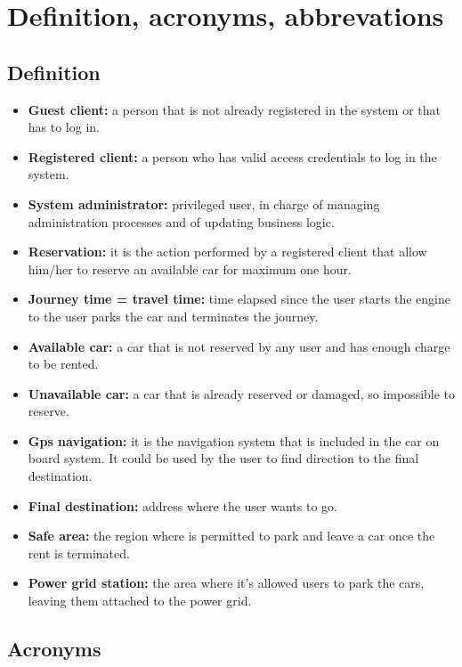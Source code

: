 \section{Definition, acronyms, abbrevations}

\subsection{Definition}

\begin{itemize}
\item \textbf{Guest client:} a person that is not already registered in the system or that has to log in.
\item \textbf{Registered client:} a person who has valid access credentials to log in the system.
\item \textbf{System administrator:} privileged user, in charge of managing administration processes and of updating business logic.
\item \textbf{Reservation:} it is the action performed by a registered client that allow him/her to reserve an available car for maximum one hour.
\item \textbf{Journey time = travel time:} time elapsed since the user starts the engine to the user parks the car and terminates the journey.
\item \textbf{Available car:} a car that is not reserved by any user and has enough charge to be rented.
\item \textbf{Unavailable car:} a car that is already reserved or damaged, so impossible to reserve.
\item \textbf{Gps navigation:} it is the navigation system that is included in the car on board system. It could be used by the user to find direction to the final destination.
\item \textbf{Final destination:} address where the user wants to go.
\item \textbf{Safe area:} the region where is permitted to park and leave a car once the rent is terminated.
\item \textbf{Power grid station:} the area where it’s allowed users to park the cars, leaving them attached to the power grid.
\end{itemize}

\subsection{Acronyms}

